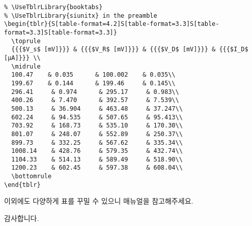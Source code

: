 \documentclass{beamer}
\begin{document}
\begin{frame}
  \framebreak
  \begin{lstlisting}
% \UseTblrLibrary{booktabs}
% \UseTblrLibrary{siunitx} in the preamble
\begin{tblr}{S[table-format=4.2]S[table-format=3.3]S[table-format=3.3]S[table-format=3.3]}
  \toprule
  {{{$V_s$ [mV]}}} & {{{$V_R$ [mV]}}} & {{{$V_D$ [mV]}}} & {{{$I_D$ [µA]}}} \\
  \midrule
  100.47    & 0.035      & 100.002    & 0.035\\
  199.67    & 0.144      & 199.46     & 0.145\\
  296.41     & 0.974      & 295.17     & 0.983\\
  400.26     & 7.470      & 392.57     & 7.539\\
  500.13     & 36.904     & 463.48     & 37.247\\
  602.24     & 94.535     & 507.65     & 95.413\\
  703.92     & 168.73     & 535.10     & 170.30\\
  801.07     & 248.07     & 552.89     & 250.37\\
  899.73     & 332.25     & 567.62     & 335.34\\
  1008.14    & 428.76     & 579.35     & 432.74\\
  1104.33    & 514.13     & 589.49     & 518.90\\
  1200.23    & 602.45     & 597.38     & 608.04\\
  \bottomrule
\end{tblr}
  \end{lstlisting}
\end{frame}

\begin{frame}[c]
  \begin{center}
    이외에도 다양하게 표를 꾸밀 수 있으니 매뉴얼을 참고해주세요.

    감사합니다.
  \end{center}
\end{frame}



\end{document}
